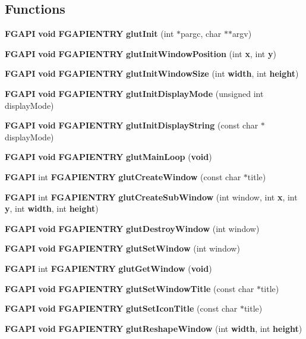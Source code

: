 \subsection*{Functions}
\begin{DoxyCompactItemize}
\item 
{\bf F\+G\+A\+P\+I} {\bf void} {\bf F\+G\+A\+P\+I\+E\+N\+T\+R\+Y} {\bf glut\+Init} (int $\ast$pargc, char $\ast$$\ast$argv)
\item 
{\bf F\+G\+A\+P\+I} {\bf void} {\bf F\+G\+A\+P\+I\+E\+N\+T\+R\+Y} {\bf glut\+Init\+Window\+Position} (int {\bf x}, int {\bf y})
\item 
{\bf F\+G\+A\+P\+I} {\bf void} {\bf F\+G\+A\+P\+I\+E\+N\+T\+R\+Y} {\bf glut\+Init\+Window\+Size} (int {\bf width}, int {\bf height})
\item 
{\bf F\+G\+A\+P\+I} {\bf void} {\bf F\+G\+A\+P\+I\+E\+N\+T\+R\+Y} {\bf glut\+Init\+Display\+Mode} (unsigned int display\+Mode)
\item 
{\bf F\+G\+A\+P\+I} {\bf void} {\bf F\+G\+A\+P\+I\+E\+N\+T\+R\+Y} {\bf glut\+Init\+Display\+String} (const char $\ast$display\+Mode)
\item 
{\bf F\+G\+A\+P\+I} {\bf void} {\bf F\+G\+A\+P\+I\+E\+N\+T\+R\+Y} {\bf glut\+Main\+Loop} ({\bf void})
\item 
{\bf F\+G\+A\+P\+I} int {\bf F\+G\+A\+P\+I\+E\+N\+T\+R\+Y} {\bf glut\+Create\+Window} (const char $\ast$title)
\item 
{\bf F\+G\+A\+P\+I} int {\bf F\+G\+A\+P\+I\+E\+N\+T\+R\+Y} {\bf glut\+Create\+Sub\+Window} (int window, int {\bf x}, int {\bf y}, int {\bf width}, int {\bf height})
\item 
{\bf F\+G\+A\+P\+I} {\bf void} {\bf F\+G\+A\+P\+I\+E\+N\+T\+R\+Y} {\bf glut\+Destroy\+Window} (int window)
\item 
{\bf F\+G\+A\+P\+I} {\bf void} {\bf F\+G\+A\+P\+I\+E\+N\+T\+R\+Y} {\bf glut\+Set\+Window} (int window)
\item 
{\bf F\+G\+A\+P\+I} int {\bf F\+G\+A\+P\+I\+E\+N\+T\+R\+Y} {\bf glut\+Get\+Window} ({\bf void})
\item 
{\bf F\+G\+A\+P\+I} {\bf void} {\bf F\+G\+A\+P\+I\+E\+N\+T\+R\+Y} {\bf glut\+Set\+Window\+Title} (const char $\ast$title)
\item 
{\bf F\+G\+A\+P\+I} {\bf void} {\bf F\+G\+A\+P\+I\+E\+N\+T\+R\+Y} {\bf glut\+Set\+Icon\+Title} (const char $\ast$title)
\item 
{\bf F\+G\+A\+P\+I} {\bf void} {\bf F\+G\+A\+P\+I\+E\+N\+T\+R\+Y} {\bf glut\+Reshape\+Window} (int {\bf width}, int {\bf height})
$$
\end{DoxyCompactItemize}
